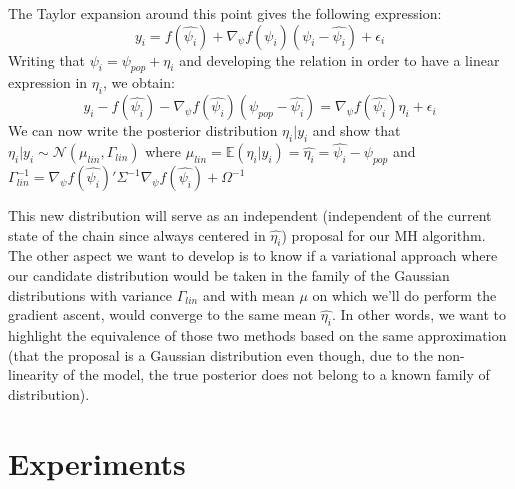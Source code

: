 \documentclass{article}
\begin{document}
The Taylor expansion around this point gives the following expression:
\begin{equation}
y_{i} = f(\hat{\psi_i}) + \nabla_{\psi}f(\hat{\psi_i})(\psi_i - \hat{\psi_i}) + \epsilon_{i}
\end{equation}
Writing that $\psi_i = \psi_{pop} + \eta_i$ and developing the relation in order to have a linear expression in $\eta_i$, we obtain:
\begin{equation}
y_{i} - f(\hat{\psi_i}) - \nabla_{\psi}f(\hat{\psi_i})(\psi_{pop} - \hat{\psi_i}) = \nabla_{\psi}f(\hat{\psi_i})\eta_i + \epsilon_{i}
\end{equation}
We can now write the posterior distribution $\eta_i|y_i$ and show that  $\eta_i|y_i \sim \mathcal{N}(\mu_{lin},\Gamma_{lin})$ where
$\mu_{lin} = \mathbb{E}(\eta_i|y_i) = \hat{\eta_i} = \hat{\psi_i} - \psi_{pop}$ and $\Gamma_{lin}^{-1} = \nabla_{\psi}f(\hat{\psi_i})'\Sigma^{-1} \nabla_{\psi}f(\hat{\psi_i}) + \Omega^{-1}$ 

This new distribution will serve as an independent (independent of the current state of the chain since always centered in $\hat{\eta_i}$) proposal for our MH algorithm.\\
The other aspect we want to develop is to know if a variational approach where our candidate distribution would be taken in the family of the Gaussian distributions with variance $\Gamma_{lin}$ and with mean $\mu$ on which we'll do perform the gradient ascent, would converge to the same mean $\hat{\eta_i}$. In other words, we want to highlight the equivalence of those two methods based on the same approximation (that the proposal is a Gaussian distribution even though, due to the non-linearity of the model, the true posterior does not belong to a known family of distribution).

\section{Experiments} 
\end{document}
